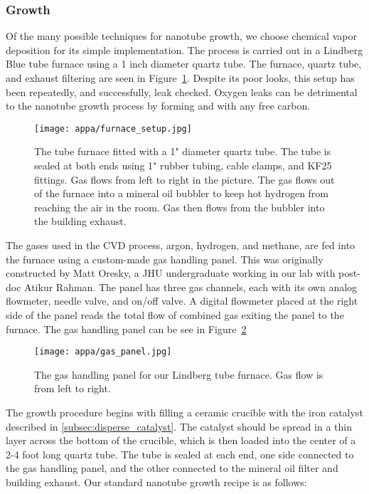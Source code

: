 \subsubsection{Growth}
\label{subsubsec:powder_cvd}

Of the many possible techniques for nanotube growth, we choose chemical vapor deposition for its simple implementation. The process is carried out in a Lindberg Blue tube furnace using a 1 inch diameter quartz tube. The furnace, quartz tube, and exhaust filtering are seen in Figure~\ref{fig:furnace_setup}. Despite its poor looks, this setup has been repeatedly, and successfully, leak checked. Oxygen leaks can be detrimental to the nanotube growth process by forming  and  with any free carbon.

\begin{figure}
    \centering
    \texttt{[image: appa/furnace\_setup.jpg]}
    \caption{The tube furnace fitted with a 1" diameter quartz tube. The tube is sealed at both ends using 1" rubber tubing, cable clamps, and KF25 fittings. Gas flows from left to right in the picture. The gas flows out of the furnace into a mineral oil bubbler to keep hot hydrogen from reaching the air in the room. Gas then flows from the bubbler into the building exhaust.}
    \label{fig:furnace_setup}
\end{figure}

The gases used in the CVD process, argon, hydrogen, and methane, are fed into the furnace using a custom-made gas handling panel. This was originally constructed by Matt Oresky, a JHU undergraduate working in our lab with post-doc Atikur Rahman. The panel has three gas channels, each with its own analog flowmeter, needle valve, and on/off valve. A digital flowmeter placed at the right side of the panel reads the total flow of combined gas exiting the panel to the furnace. The gas handling panel can be see in Figure~\ref{fig:gas_panel}

\begin{figure}
    \centering
    \texttt{[image: appa/gas\_panel.jpg]}
    \caption{The gas handling panel for our Lindberg tube furnace. Gas flow is from left to right.}
    \label{fig:gas_panel}
\end{figure}

The growth procedure begins with filling a ceramic crucible with the iron catalyst described in \ref{subsec:disperse_catalyst}. The catalyst should be spread in a thin layer across the bottom of the crucible, which is then loaded into the center of a 2-4 foot long quartz tube. The tube is sealed at each end, one side connected to the gas handling panel, and the other connected to the mineral oil filter and building exhaust. Our standard nanotube growth recipe is as follows: 

